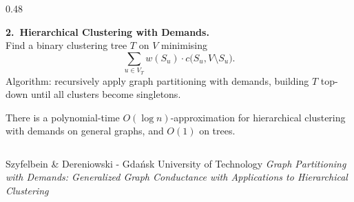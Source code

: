 \documentclass[final]{beamer}
\newcommand{\thmterm}[2]{%
  \begin{tcolorbox}[thmbox,title={#1}]
  #2
  \end{tcolorbox}}
\begin{document}
\begin{frame}[t]{}
\begin{columns}[T]
\begin{column}{0.48\textwidth}
\begin{tcolorbox}[appbox,title={Applications}]
\bigskip
\textbf{2.\ Hierarchical Clustering with Demands.}\\
Find a binary clustering tree $T$ on $V$ minimising
\[
  \sum_{u\in V_T} w(S_u)\cdot c\bigl(S_u,V\setminus S_u\bigr).
\]
Algorithm: recursively apply graph partitioning with demands,
building $T$ top-down until all clusters become singletons.

\smallskip
\thmterm{Corollary}{
  There is a polynomial-time $O(\log n)$-approximation for
  hierarchical clustering with demands on general graphs, and
  $O(1)$ on trees.
}

\end{tcolorbox}

\end{column}
\end{columns}

\vfill

\begin{tcolorbox}[
  enhanced,colback=titlebg,colframe=titlebg,arc=0pt,boxrule=0pt,
  left=12mm,right=12mm,top=4mm,bottom=4mm
]
  {\color{white}\small
   Szyfelbein \& Dereniowski - Gda\'nsk University of Technology \hfill
   \emph{Graph Partitioning with Demands: Generalized Graph Conductance with Applications to Hierarchical Clustering}}
\end{tcolorbox}

\end{frame}
\end{document}
